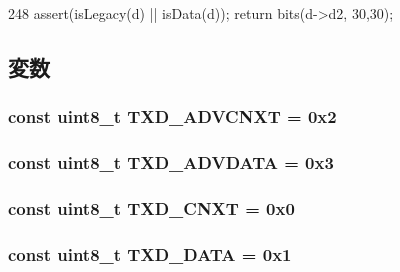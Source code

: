 \begin{DoxyCode}
248 { assert(isLegacy(d) || isData(d)); return bits(d->d2, 30,30); }
\end{DoxyCode}


\subsection{変数}
\hypertarget{namespaceiGbReg_1_1TxdOp_a715b843e900b8ccb187c30b76c8643b7}{
\subsubsection[{TXD\_\-ADVCNXT}]{\setlength{\rightskip}{0pt plus 5cm}const uint8\_\-t {\bf TXD\_\-ADVCNXT} = 0x2}}
\label{namespaceiGbReg_1_1TxdOp_a715b843e900b8ccb187c30b76c8643b7}
\hypertarget{namespaceiGbReg_1_1TxdOp_a97280b2931b22cb8a343e91ee6d0fd80}{
\subsubsection[{TXD\_\-ADVDATA}]{\setlength{\rightskip}{0pt plus 5cm}const uint8\_\-t {\bf TXD\_\-ADVDATA} = 0x3}}
\label{namespaceiGbReg_1_1TxdOp_a97280b2931b22cb8a343e91ee6d0fd80}
\hypertarget{namespaceiGbReg_1_1TxdOp_a134b13753f53fae4712f0cf445beb0fe}{
\subsubsection[{TXD\_\-CNXT}]{\setlength{\rightskip}{0pt plus 5cm}const uint8\_\-t {\bf TXD\_\-CNXT} = 0x0}}
\label{namespaceiGbReg_1_1TxdOp_a134b13753f53fae4712f0cf445beb0fe}
\hypertarget{namespaceiGbReg_1_1TxdOp_a489d6c941b18bbb3bd7e7cd54c9774f6}{
\subsubsection[{TXD\_\-DATA}]{\setlength{\rightskip}{0pt plus 5cm}const uint8\_\-t {\bf TXD\_\-DATA} = 0x1}}
\label{namespaceiGbReg_1_1TxdOp_a489d6c941b18bbb3bd7e7cd54c9774f6}
